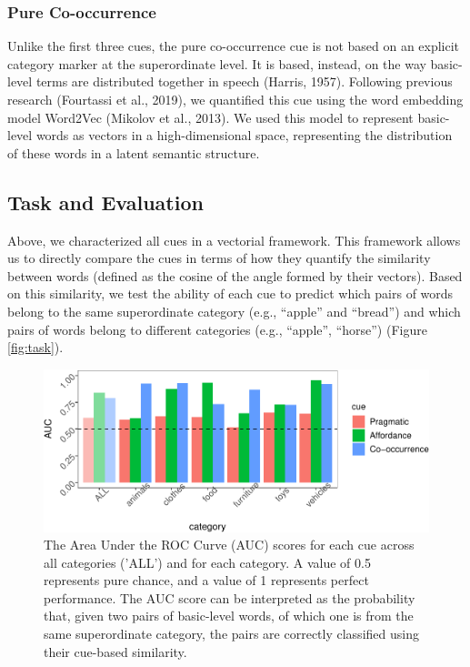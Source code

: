 \documentclass[10pt, letterpaper]{article}
\newenvironment{CodeChunk}{}{}
\begin{document}
\hypertarget{pure-co-occurrence}{%
\subsubsection{Pure Co-occurrence}\label{pure-co-occurrence}}

Unlike the first three cues, the pure co-occurrence cue is not based on
an explicit category marker at the superordinate level. It is based,
instead, on the way basic-level terms are distributed together in speech
(Harris, 1957). Following previous research (Fourtassi et al., 2019), we
quantified this cue using the word embedding model Word2Vec (Mikolov et
al., 2013). We used this model to represent basic-level words as vectors
in a high-dimensional space, representing the distribution of these
words in a latent semantic structure.

\hypertarget{task-and-evaluation}{%
\subsection{Task and Evaluation}\label{task-and-evaluation}}

Above, we characterized all cues in a vectorial framework. This
framework allows us to directly compare the cues in terms of how they
quantify the similarity between words (defined as the cosine of the
angle formed by their vectors). Based on this similarity, we test the
ability of each cue to predict which pairs of words belong to the same
superordinate category (e.g., ``apple'' and ``bread'') and which pairs
of words belong to different categories (e.g., ``apple'', ``horse'')
(Figure \ref{fig:task}).

\begin{CodeChunk}
\begin{figure}[h]

{\centering \includegraphics{cogsci_files/figure-latex/all_data-1} 

}

\caption{\label{fig:data_all} The Area Under the ROC Curve (AUC) scores for each cue across all categories ('ALL') and for each category. A value of 0.5 represents pure chance, and a value of 1 represents perfect performance. The AUC score can be interpreted as the probability that, given two pairs of basic-level words, of which one is from the same superordinate category, the pairs are correctly classified using their  cue-based similarity.}\label{fig:all_data}
\end{figure}
\end{CodeChunk}
\end{document}
